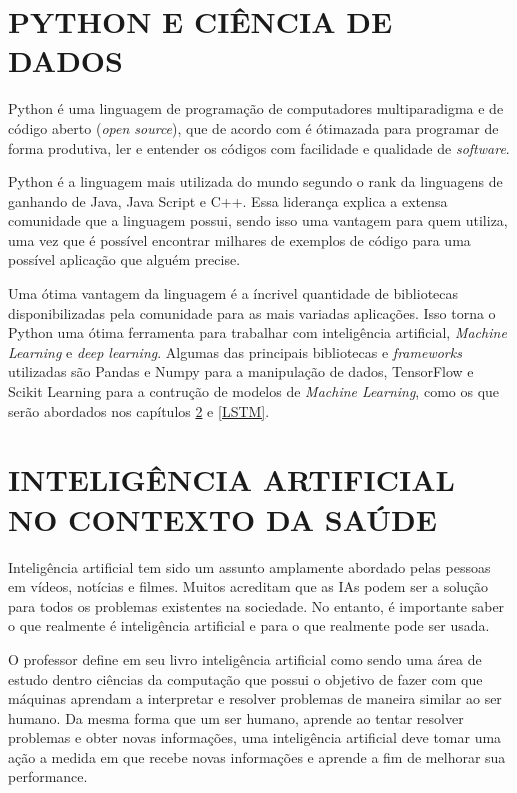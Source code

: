 \documentclass[
  12pt,		%
  a4paper,	%
  openright,%
  oneside,	%
  chapter=TITLE,		%
  section=TITLE,		%
  english,	%
  french,	%
  spanish,	%
  brazil	%
]{abntex2}
\begin{document}
    \section{PYTHON E CIÊNCIA DE DADOS}
    Python é uma linguagem de programação de computadores multiparadigma e de código aberto (\textit{open source}), 
    que de acordo com \cite[]{learning_python} é ótimazada para programar de forma produtiva, ler e entender os códigos
    com facilidade e qualidade de \textit{software}.

    Python é a linguagem mais utilizada do mundo segundo o rank da linguagens de \cite[]{PYPL} ganhando de Java, Java Script e C++. Essa liderança
    explica a extensa comunidade que a linguagem possui, sendo isso uma vantagem para quem utiliza, uma vez que é possível encontrar milhares
    de exemplos de código para uma possível aplicação que alguém precise.
    
    Uma ótima vantagem da linguagem é a íncrivel quantidade de bibliotecas disponibilizadas pela comunidade para as mais variadas aplicações. Isso
    torna o Python uma ótima ferramenta para trabalhar com inteligência artificial, \textit{Machine Learning} e \textit{deep learning}. Algumas das principais
    bibliotecas e \textit{frameworks} utilizadas são Pandas e Numpy para a manipulação de dados, TensorFlow e Scikit Learning para
    a contrução de modelos de \textit{Machine Learning}, como os que serão abordados nos capítulos \ref*{IA} e \ref*{LSTM}.
    
    \section{INTELIGÊNCIA ARTIFICIAL NO CONTEXTO DA SAÚDE}
    \label{IA}
    Inteligência artificial tem sido um assunto amplamente abordado pelas pessoas em vídeos, notícias e filmes. Muitos
    acreditam que as IAs podem ser a solução para todos os problemas existentes na sociedade. No entanto, é importante
    saber o que realmente é inteligência artificial e para o que realmente pode ser usada.

    O professor \cite[]{IA_python} define em seu livro inteligência artificial como sendo uma área de estudo dentro ciências da computação
    que possui o objetivo de fazer com que máquinas aprendam a interpretar e resolver problemas de maneira similar
    ao ser humano. Da mesma forma que um ser humano, aprende ao tentar resolver problemas e obter novas informações, uma inteligência artificial
    deve tomar uma ação a medida em que recebe novas informações e aprende a fim de melhorar sua performance.
\end{document}
